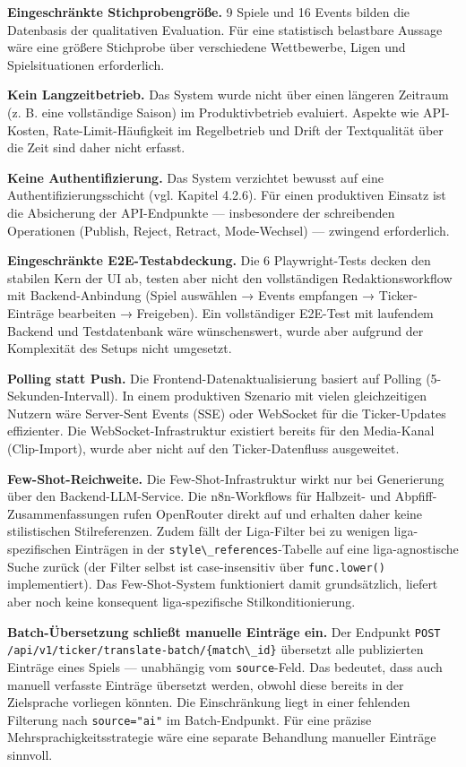 \textbf{Eingeschränkte Stichprobengröße.} 9 Spiele und 16 Events bilden
die Datenbasis der qualitativen Evaluation. Für eine statistisch
belastbare Aussage wäre eine größere Stichprobe über verschiedene
Wettbewerbe, Ligen und Spielsituationen erforderlich.

\textbf{Kein Langzeitbetrieb.} Das System wurde nicht über einen
längeren Zeitraum (z. B. eine vollständige Saison) im Produktivbetrieb
evaluiert. Aspekte wie API-Kosten, Rate-Limit-Häufigkeit im Regelbetrieb
und Drift der Textqualität über die Zeit sind daher nicht erfasst.

\textbf{Keine Authentifizierung.} Das System verzichtet bewusst auf eine
Authentifizierungsschicht (vgl. Kapitel 4.2.6). Für einen produktiven
Einsatz ist die Absicherung der API-Endpunkte --- insbesondere der
schreibenden Operationen (Publish, Reject, Retract, Mode-Wechsel) ---
zwingend erforderlich.

\textbf{Eingeschränkte E2E-Testabdeckung.} Die 6 Playwright-Tests decken
den stabilen Kern der UI ab, testen aber nicht den vollständigen
Redaktionsworkflow mit Backend-Anbindung (Spiel auswählen → Events
empfangen → Ticker-Einträge bearbeiten → Freigeben). Ein vollständiger
E2E-Test mit laufendem Backend und Testdatenbank wäre wünschenswert,
wurde aber aufgrund der Komplexität des Setups nicht umgesetzt.

\textbf{Polling statt Push.} Die Frontend-Datenaktualisierung basiert
auf Polling (5-Sekunden-Intervall). In einem produktiven Szenario mit
vielen gleichzeitigen Nutzern wäre Server-Sent Events (SSE) oder
WebSocket für die Ticker-Updates effizienter. Die
WebSocket-Infrastruktur existiert bereits für den Media-Kanal
(Clip-Import), wurde aber nicht auf den Ticker-Datenfluss ausgeweitet.

\textbf{Few-Shot-Reichweite.} Die Few-Shot-Infrastruktur wirkt nur bei
Generierung über den Backend-LLM-Service. Die n8n-Workflows für
Halbzeit- und Abpfiff-Zusammenfassungen rufen OpenRouter direkt auf und
erhalten daher keine stilistischen Stilreferenzen. Zudem fällt der
Liga-Filter bei zu wenigen liga-spezifischen Einträgen in der
\passthrough{\lstinline!style\_references!}-Tabelle auf eine
liga-agnostische Suche zurück (der Filter selbst ist case-insensitiv
über \passthrough{\lstinline!func.lower()!} implementiert). Das
Few-Shot-System funktioniert damit grundsätzlich, liefert aber noch
keine konsequent liga-spezifische Stilkonditionierung.

\textbf{Batch-Übersetzung schließt manuelle Einträge ein.} Der Endpunkt
\passthrough{\lstinline!POST /api/v1/ticker/translate-batch/\{match\_id\}!}
übersetzt alle publizierten Einträge eines Spiels --- unabhängig vom
\passthrough{\lstinline!source!}-Feld. Das bedeutet, dass auch manuell
verfasste Einträge übersetzt werden, obwohl diese bereits in der
Zielsprache vorliegen könnten. Die Einschränkung liegt in einer
fehlenden Filterung nach \passthrough{\lstinline!source="ai"!} im
Batch-Endpunkt. Für eine präzise Mehrsprachigkeitsstrategie wäre eine
separate Behandlung manueller Einträge sinnvoll.

